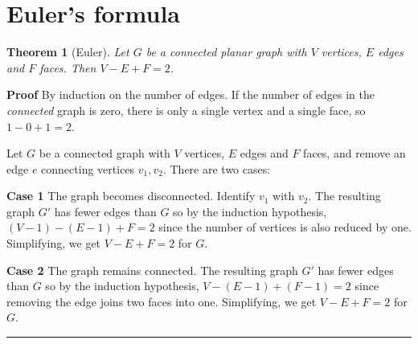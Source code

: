 \documentclass[11pt,a4paper]{article}
\newtheorem{theorem}{Theorem}
\newcommand*{\qed}{\hfill\rule{1ex}{1.5ex}}
\begin{document}
\section{Euler's formula}

\begin{theorem}[Euler]\label{thm.euler}
Let $G$ be a connected planar graph with $V$ vertices, $E$ edges and $F$ faces. Then $V-E+F=2$.
\end{theorem}

\textbf{Proof} By induction on the number of edges. If the number of edges in the \emph{connected} graph is zero, there is only a single vertex and a single face, so $1-0+1=2$.

Let $G$ be a connected graph with $V$ vertices, $E$ edges and $F$ faces, and remove an edge $e$ connecting vertices $v_1,v_2$. There are two cases:

\textbf{Case 1} The graph becomes disconnected. Identify $v_1$ with $v_2$. The resulting graph $G'$ has fewer edges than $G$ so by the induction hypothesis, $(V-1)-(E-1)+F=2$ since the number of vertices is also reduced by one. Simplifying, we get $V-E+F=2$ for $G$.

\begin{center}
\end{center}

\textbf{Case 2} The graph remains connected. The resulting graph $G'$ has fewer edges than $G$ so by the induction hypothesis, $V-(E-1)+(F-1)=2$ since removing the edge joins two faces into one. Simplifying, we get $V-E+F=2$ for $G$.

\begin{center}
\end{center}
\qed
\end{document}
